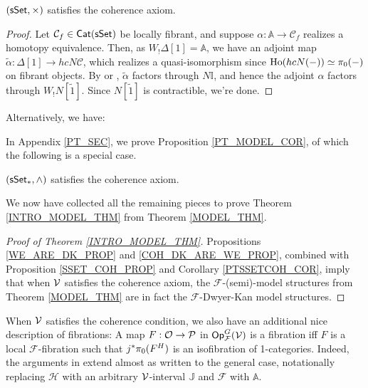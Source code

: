 \documentclass[a4paper,10pt
,draft
]{article}%
\renewcommand{\F}{\mathcal F}
\newcommand{\I}{\mathbb I}
\renewcommand{\1}{\eta}%
\begin{document}
\begin{proposition}
      \label{SSET_COH_PROP}
      $(\mathsf{sSet}, \times)$
      satisfies the coherence axiom.
\end{proposition}
\begin{proof}
      Let $\mathcal C_f \in \mathsf{Cat}(\mathsf{sSet})$ be locally fibrant, and
      suppose $\alpha: \mathbb A \to \mathcal C_f$ realizes a homotopy equivalence.
      Then, as $W_!\Delta[1] = \mathbb A$, we have an adjoint map $\tilde \alpha: \Delta[1] \to h c N \mathcal C$,
      which realizes a quasi-isomorphism since $\operatorname{Ho}(h c N (-)) \simeq \pi_0(-)$ on fibrant objects.
      By \cite[Corollary 1.6]{Joy02} or \cite[Lemma 0.15]{Rie}, $\tilde \alpha$ factors through $N \I$,
      and hence the adjoint $\alpha$ factors through $W_!N[\tilde 1]$.
      Since $N[\tilde 1]$ is contractible, we're done.
      
\end{proof}

Alternatively, we have:


In Appendix \ref{PT_SEC}, we prove Proposition \ref{PT_MODEL_COR}, of which the following is a special case.
\begin{corollary}
      \label{PTSSETCOH_COR}
      $(\sSet_{\**}, \wedge)$ satisfies the coherence axiom.
\end{corollary}

We now have collected all the remaining pieces to prove Theorem \ref{INTRO_MODEL_THM} from Theorem \ref{MODEL_THM}.

\begin{proof}
      [Proof of Theorem \ref{INTRO_MODEL_THM}]
      Propositions \ref{WE_ARE_DK_PROP} and \ref{COH_DK_ARE_WE_PROP},
      combined with Proposition \ref{SSET_COH_PROP} and Corollary \ref{PTSSETCOH_COR},
      imply that when $\mathcal V$ satisfies the coherence axiom, 
      the $\F$-(semi)-model structures from Theorem \ref{MODEL_THM} are in fact the $\F$-Dwyer-Kan model structures.
\end{proof}




\begin{remark}
      \label{FIB_ISOFIB_REM}
      When $\mathcal V$ satisfies the coherence condition, we also have an additional nice description of fibrations:
      A map $F: \mathcal{O} \to \mathcal{P}$ in $\Op^G_\F(\V)$ is a fibration iff
      $F$ is a local $\F$-fibration such that
      $j^{\**}\pi_0(F^H)$ is an isofibration of 1-categories.
      Indeed, the arguments in \cite[Propositions 2.3 and 2.5]{Ber07b} extend almost as written to the general case,
      notationally replacing $\mathcal H$ with an arbitrary $\mathcal V$-interval $\mathbb J$ and $\mathscr F$ with $\mathbb A$.
\end{remark}
\end{document}
